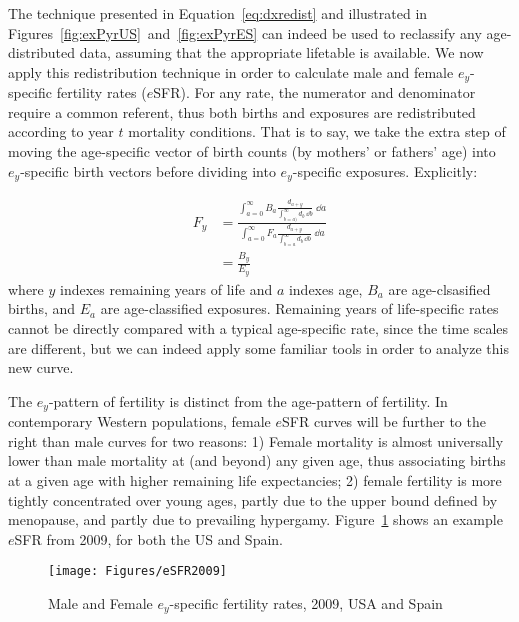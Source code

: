  \FloatBarrier
 \label{sec:exrates}
The technique presented in Equation~\ref{eq:dxredist} and illustrated in
Figures~\ref{fig:exPyrUS}~and~\ref{fig:exPyrES} can indeed be used to reclassify
any age-distributed data, assuming that the appropriate lifetable is available.
We now apply this redistribution technique in order to calculate male and 
female $e_y$-specific fertility rates ($e$SFR). For any rate, the numerator 
and denominator require a common referent, thus both births and exposures are 
redistributed according to year $t$ mortality conditions. That
is to say, we take the extra step of moving the age-specific vector
of birth counts (by mothers' or fathers' age) into $e_y$-specific birth
vectors before dividing into $e_y$-specific exposures. Explicitly:

\begin{align}
\label{eq:eSFR}
F_{y} &= \frac{\int _{a = 0} ^{\infty} B_a \frac{d_{a + y}}{\int _{b = a)}
^{\infty} d_b\, \dd b} \;\dd a}{\int _{a = 0} ^{\infty} F_a \frac{d_{a + y}}{\int _{b = a} ^{\infty} d_b\, \dd b} \;\dd a} \\
 &= \frac{B_{y}}{E_{y}}
\end{align}
where $y$ indexes remaining years of life and $a$ indexes age, $B_a$ are
age-clsasified births, and $E_a$ are age-classified exposures. Remaining years
of life-specific rates cannot be directly compared with a typical age-specific
rate, since the time scales are different, but we 
can indeed apply some familiar tools in order to analyze this new curve.

The $e_y$-pattern of fertility is distinct from the age-pattern of fertility. 
In contemporary Western populations, female $e$SFR curves will be
further to the right than male curves for two reasons: 1) Female mortality is
almost universally lower than male mortality at (and beyond) any given age,
thus associating births at a given age with higher remaining life expectancies; 2)
female fertility is more tightly concentrated over young ages, partly due to the
upper bound defined by menopause, and partly due to prevailing hypergamy.
Figure~\ref{fig:eSFR2009} shows an example $e$SFR from 2009, for both the US and Spain.

\begin{figure}[ht!]
        \centering  
          \caption{Male and Female $e_y$-specific fertility rates, 2009, USA and
          Spain}
           \texttt{[image: Figures/eSFR2009]}
          \label{fig:eSFR2009}
\end{figure}

